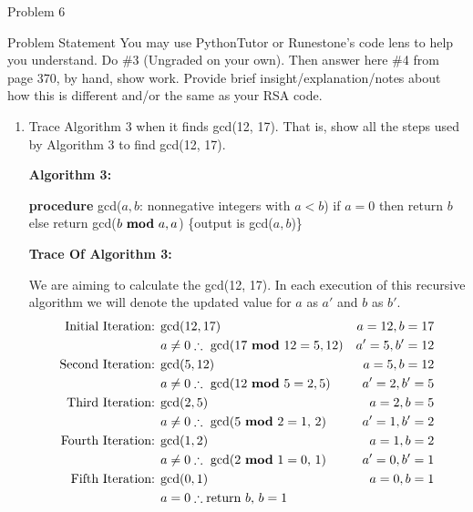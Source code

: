 \begin{problem}{Problem 6}
    \begin{statement}{Problem Statement}
        You may use PythonTutor or Runestone's code lens to help you understand. Do \#3 (Ungraded on your own). Then answer here \#4 from page 370, by hand, show work. Provide brief insight/explanation/notes 
        about how this is different and/or the same as your RSA code.
    \end{statement}

    \begin{Highlight}[Solution - \#4]
        \begin{enumerate}[label = \arabic*., start = 4]
            \item Trace Algorithm 3 when it finds gcd(12, 17). That is, show all the steps used by Algorithm 3 to find gcd(12, 17). \vspace*{1em}
            
            \noindent \textbf{Algorithm 3:} \vspace*{1em}

            \textbf{procedure} gcd($a, b$: nonnegative integers with $a < b$) \newline
            if $a = 0$ then return $b$ \newline
            else return gcd($b \text{ \textbf{mod} } a, a$) \newline
            \{output is gcd($a, b$)\} \newline

            \noindent \textbf{Trace Of Algorithm 3:} \vspace*{1em}

            We are aiming to calculate the gcd(12, 17). In each execution of this recursive algorithm we will denote the updated value for $a$ as $a'$ and $b$ as $b'$.
            \begin{align*}
                \text{Initial Iteration: } & \text{gcd($12,17$)} & a = 12, b = 17 \\
                & a \neq 0 \therefore \text{ gcd($17 \text{ \textbf{mod} } 12 = 5, 12$)} & a' = 5, b' = 12 \\
                \text{Second Iteration: } & \text{gcd($5,12$)} & a = 5, b = 12 \\
                & a \neq 0 \therefore \text{ gcd($12 \text{ \textbf{mod} } 5 = 2, 5$)} & a' = 2, b' = 5 \\
                \text{Third Iteration: } & \text{gcd($2,5$)} & a = 2, b = 5 \\
                & a \neq 0 \therefore \text{ gcd($5 \text{ \textbf{mod} } 2 = 1$, 2)} & a' = 1, b' = 2 \\
                \text{Fourth Iteration: } & \text{gcd($1,2$)} & a = 1, b = 2 \\
                & a \neq 0 \therefore \text{ gcd($2 \text{ \textbf{mod} } 1 = 0$, 1)} & a' = 0, b' = 1 \\
                \text{Fifth Iteration: } & \text{gcd($0,1$)} & a = 0, b = 1 \\
                & a = 0 \therefore \text{return $b$, $b = 1$} &
            \end{align*}


\end{enumerate}
\end{Highlight}
\end{problem}
